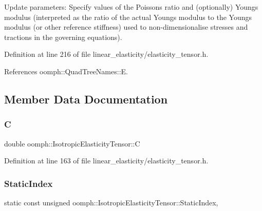 Update parameters\+: Specify values of the Poisson\textquotesingle{}s ratio and (optionally) Young\textquotesingle{}s modulus (interpreted as the ratio of the actual Young\textquotesingle{}s modulus to the Young\textquotesingle{}s modulus (or other reference stiffness) used to non-\/dimensionalise stresses and tractions in the governing equations). 



Definition at line 216 of file linear\+\_\+elasticity/elasticity\+\_\+tensor.\+h.



References oomph\+::\+Quad\+Tree\+Names\+::E.



\subsection{Member Data Documentation}
\mbox{\label{classoomph_1_1IsotropicElasticityTensor_a7189e7c72bcf36be75a4ba42f0675aff}} 
\subsubsection{\texorpdfstring{C}{C}}
{\footnotesize\ttfamily double oomph\+::\+Isotropic\+Elasticity\+Tensor\+::C\hspace{0.3cm}{\ttfamily [private]}}



Definition at line 163 of file linear\+\_\+elasticity/elasticity\+\_\+tensor.\+h.

\mbox{\label{classoomph_1_1IsotropicElasticityTensor_aa100bfbbb893872dcb54c7090800d701}} 
\subsubsection{\texorpdfstring{Static\+Index}{StaticIndex}}
{\footnotesize\ttfamily static const unsigned oomph\+::\+Isotropic\+Elasticity\+Tensor\+::\+Static\+Index\hspace{0.3cm}{\ttfamily [static]}, {\ttfamily [private]}}

